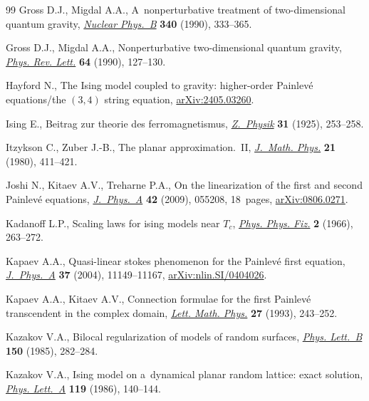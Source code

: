 \documentclass[pdftex]{sigma}
\numberwithin{equation}{section}
\begin{document}
\begin{thebibliography}{99}
Gross D.J., Migdal A.A., A~nonperturbative treatment of two-dimensional quantum
 gravity, \href{https://doi.org/10.1016/0550-3213(90)90450-R}{\textit{Nuclear
 Phys.~B}} \textbf{340} (1990), 333--365.

Gross D.J., Migdal A.A., Nonperturbative two-dimensional quantum gravity,
 \href{https://doi.org/10.1103/PhysRevLett.64.127}{\textit{Phys. Rev. Lett.}}
 \textbf{64} (1990), 127--130.

Hayford N., The {I}sing model coupled to gravity: higher-order {P}ainlev\'e
 equations/the $(3,4)$ string equation,
 \href{http://arxiv.org/abs/2405.03260}{arXiv:2405.03260}.

Ising E., Beitrag zur theorie des ferromagnetismus,
 \href{https://doi.org/10.1007/BF02980577}{\textit{Z.~Physik}} \textbf{31}
 (1925), 253--258.

Itzykson C., Zuber J.-B., The planar approximation.~{II},
 \href{https://doi.org/10.1063/1.524438}{\textit{J.~Math. Phys.}} \textbf{21}
 (1980), 411--421.

Joshi N., Kitaev A.V., Treharne P.A., On the linearization of the first and
 second {P}ainlev\'e equations,
 \href{https://doi.org/10.1088/1751-8113/42/5/055208}{\textit{J.~Phys.~A}}
 \textbf{42} (2009), 055208, 18~pages, \href{http://arxiv.org/abs/0806.0271}{arXiv:0806.0271}.

Kadanoff L.P., Scaling laws for ising models near {${T}_c$},
 \href{https://doi.org/10.1103/PhysicsPhysiqueFizika.2.263}{\textit{Phys.
 Phys. Fiz.}} \textbf{2} (1966), 263--272.

Kapaev A.A., Quasi-linear stokes phenomenon for the {P}ainlev\'e first
 equation,
 \href{https://doi.org/10.1088/0305-4470/37/46/005}{\textit{J.~Phys.~A}}
 \textbf{37} (2004), 11149--11167, \href{http://arxiv.org/abs/nlin.SI/0404026}{arXiv:nlin.SI/0404026}.

Kapaev A.A., Kitaev A.V., Connection formulae for the first {P}ainlev\'e
 transcendent in the complex domain,
 \href{https://doi.org/10.1007/BF00777371}{\textit{Lett. Math. Phys.}}
 \textbf{27} (1993), 243--252.

Kazakov V.A., Bilocal regularization of models of random surfaces,
 \href{https://doi.org/10.1016/0370-2693(85)91011-1}{\textit{Phys. Lett.~B}}
 \textbf{150} (1985), 282--284.

Kazakov V.A., Ising model on a~dynamical planar random lattice: exact solution,
 \href{https://doi.org/10.1016/0375-9601(86)90433-0}{\textit{Phys. Lett.~A}}
 \textbf{119} (1986), 140--144.


\end{thebibliography}
\end{document}
